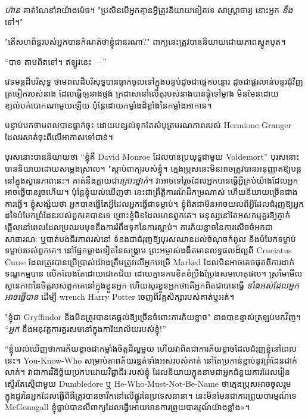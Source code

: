 \emph{ហ៊ាន} គាត់ណែនាំវាយ៉ាងម៉េច។ "ប្រសិនបើអ្នកគ្មានអ្វីត្រូវនិយាយទៀតទេ សាស្រ្តាចារ្យ នោះអ្នក \emph{នឹង} ទៅ។"

"តើសហព័ន្ធរបស់អ្នកបានកំណត់ថាខ្ញុំជានរណា?" ពាក្យនេះត្រូវបាននិយាយដោយភាពស្លូតបូត។

“បាទ តាមពិតទៅ។ ឥឡូវនេះ —”

វេទមន្តដ៏បរិសុទ្ធ ថាមពលដ៏បរិសុទ្ធបានធ្លាក់ចូលទៅក្នុងបន្ទប់ដូចជាផ្លេកបន្ទោរ ដូចជាផ្គរលាន់បន្ទរជុំវិញត្រចៀករបស់នាង ដែលធ្វើឲ្យនាងថ្លង់ ក្រដាសនៅលើតុរបស់នាងបានផ្លុំទៅម្ខាង មិនមែនដោយខ្យល់បក់បោកណាមួយឡើយ ប៉ុន្តែដោយកម្លាំងដ៏ខ្លាំងនៃកម្លាំងអាកាន។

បន្ទាប់មកថាមពលបានធ្លាក់ចុះ ដោយបន្សល់ទុកតែសំបុត្រមរណភាពរបស់ Hermione Granger ដែលរសាត់ចុះពីលើអាកាសទៅជាន់។

បុរសនោះបាននិយាយថា “ខ្ញុំគឺ David Monroe ដែលបានប្រយុទ្ធជាមួយ Voldemort” បុរសនោះបាននិយាយដោយសម្លេងស្រាល។ "ស្តាប់ពាក្យរបស់ខ្ញុំ។ ក្មេង​ប្រុស​នេះ​មិន​អាច​ត្រូវ​បាន​អនុញ្ញាត​ឱ្យ​បន្ត​នៅ​ក្នុង​ស្ថានភាព​នេះ​។ គាត់នឹងក្លាយជា\emph{គ្រោះថ្នាក់}។ វាអាចទៅរួចដែលអ្នកបានធ្វើអ្វីគ្រប់យ៉ាងដែលអ្នកអាចធ្វើបានរួចហើយ។ ប៉ុន្តែ​ខ្ញុំ​យល់​ឃើញ​ថា នេះ​ជា​ព្រឹត្តិការណ៍​ដ៏​កម្រ​ណាស់ ហើយ​និយាយ​ច្រើន​ជាង​ការ​ធ្វើ។ ខ្ញុំ​សង្ស័យ​ថា អ្នក​បាន​ធ្វើ​តែ​អ្វី​ដែល​អ្នក​ធ្វើ​ជា​ទម្លាប់។ ខ្ញុំពិតជាមិនអាចយល់ពីអ្វីដែលជំរុញឱ្យអ្នកដទៃបំបែកព្រំដែនរបស់ពួកគេបានទេ ព្រោះខ្ញុំមិនដែលមានពួកគេ។ មនុស្សនៅតែអសកម្មគួរឱ្យភ្ញាក់ផ្អើលនៅពេលដែលប្រឈមមុខនឹងការរំពឹងទុកនៃការស្លាប់។ ការភ័យខ្លាចនៃការសើចចំអកជាសាធារណៈ ឬបាត់បង់ជីវភាពរស់នៅ ទំនងជាជំរុញឱ្យបុរសឈានដល់ចំណុចកំពូល និងបំបែកទម្លាប់ទម្លាប់របស់ពួកគេ។ នៅផ្នែកម្ខាងទៀតនៃសង្រ្គាម ព្រះអម្ចាស់ងងឹតមានលទ្ធផលដ៏ល្អពី Cruciatus Curse ដែលត្រូវបានប្រើប្រាស់យ៉ាងត្រឹមត្រូវលើអ្នកបម្រើ Marked ដែលមិនអាចគេចផុតពីការដាក់ទណ្ឌកម្មបាន លើកលែងតែដោយជោគជ័យ ដោយគ្មានការខិតខំប្រឹងប្រែងសមហេតុផល។ ស្រមៃមើលស្ថានភាពនៃចិត្តរបស់ពួកគេនៅក្នុងខ្លួនអ្នក ហើយសួរខ្លួនអ្នកថាតើអ្នកពិតជាបានធ្វើ \emph{ទាំងអស់ដែលអ្នកអាចធ្វើបាន} ដើម្បី wrench Harry Potter ចេញពីវគ្គសិក្សារបស់គាត់ឬអត់។

"ខ្ញុំជា Gryffindor និងមិនត្រូវបានគេផ្តល់ឱ្យច្រើនចំពោះការភ័យខ្លាច" នាងបានខ្ទាស់ត្រឡប់មកវិញ។ “\emph{អ្នក} នឹងអនុវត្តការគួរសមនៅក្នុងការិយាល័យរបស់ខ្ញុំ!”

“ខ្ញុំយល់ឃើញថាការភ័យខ្លាចជាកម្លាំងចិត្តដ៏ល្អមួយ ហើយវាពិតជាការភ័យខ្លាចដែលជំរុញខ្ញុំនៅពេលនេះ។ You-Know-Who សម្រាប់ភាពភ័យរន្ធត់ទាំងអស់របស់គាត់ នៅតែប្រកាន់ខ្ជាប់នូវព្រំដែនជាក់លាក់។ វាជាការវិនិច្ឆ័យប្រកបដោយវិជ្ជាជីវៈរបស់ខ្ញុំ ដែលនិយាយក្នុងនាមជាអ្នកជំនួយការដែលរៀនស្ទើរតែស្មើជាមួយ Dumbledore ឬ He-Who-Must-Not-Be-Name ថាក្មេងប្រុសអាចចូលរួមក្នុងជួរនៃអ្នកដែលធ្វើពិធីត្រូវបានចារឹកនៅលើផ្នូរនៃប្រទេសនានា។ នេះមិនមែនជាការព្រួយបារម្មណ៍ទេ McGonagall ខ្ញុំធ្លាប់បានលឺពាក្យដែលធ្វើអោយមានការព្រួយបារម្មណ៍យ៉ាងខ្លាំង»។

